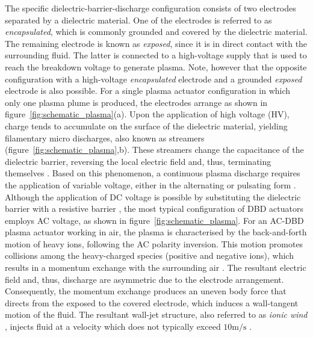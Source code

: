 The specific dielectric-barrier-discharge configuration consists of two electrodes separated by a dielectric material. One of the electrodes is referred to as \textit{encapsulated}, which is commonly grounded and covered by the dielectric material. The remaining electrode is known as \textit{exposed}, since it is in direct contact with the surrounding fluid. The latter is connected to a high-voltage supply that is used to reach the breakdown voltage to generate plasma. Note, however that the opposite configuration with a high-voltage \textit{encapsulated} electrode and a grounded \textit{exposed} electrode is also possible. For a single plasma actuator configuration in which only one plasma plume is produced, the electrodes arrange as shown in figure~\ref{fig:schematic_plasma}(a). Upon the application of high voltage (HV), charge tends to accumulate on the surface of the dielectric material, yielding filamentary micro discharges, also known as streamers \citep{Kogelschatz2002filamentary} (figure~\ref{fig:schematic_plasma},b). These streamers change the capacitance of the dielectric barrier, reversing the local electric field and, thus, terminating themselves \citep{Eliasson1991streamers}. Based on this phenomenon, a continuous plasma discharge requires the application of variable voltage, either in the alternating or pulsating form \citep{michelis2017boundary}. Although the application of DC voltage is possible by substituting the dielectric barrier with a resistive barrier \citep{Laroussi2002resistive}, the most typical configuration of DBD actuators employs AC voltage, as shown in figure~\ref{fig:schematic_plasma}. For an AC-DBD plasma actuator working in air, the plasma is characterised by the back-and-forth motion of heavy ions, following the AC polarity inversion. This motion promotes collisions among the heavy-charged species (positive and negative ions), which results in a momentum exchange with the surrounding air \citep{Kotsonis2015review}. The resultant electric field and, thus, discharge are asymmetric due to the electrode arrangement. Consequently, the momentum exchange produces an uneven body force that directs from the exposed to the covered electrode, which induces a wall-tangent motion of the fluid. The resultant wall-jet structure, also referred to as \textit{ionic wind} \citep{Benard2014review}, injects fluid at a velocity which does not typically exceed $10\mathrm{m/s}$ \citep{Moreau2007review}.

